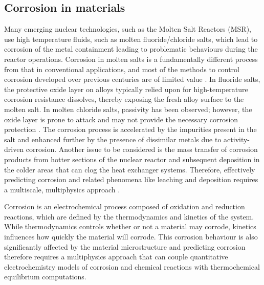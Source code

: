 	\subsection{Corrosion in materials}
	Many emerging nuclear technologies, such as the Molten Salt Reactors (MSR), use high temperature fluids, such as molten fluoride/chloride salts, which lead to corrosion of the metal containment leading to problematic behaviours during the reactor operations. Corrosion in molten salts is a fundamentally different process from that in conventional applications, and most of the methods to control corrosion developed over previous centuries are of limited value \cite{Yoshioka:2017aa}. In fluoride salts, the protective oxide layer on alloys typically relied upon for high-temperature corrosion resistance dissolves, thereby exposing the fresh alloy surface to the molten salt. In molten chloride salts, passivity has been observed; however, the oxide layer is prone to attack and may not provide the necessary corrosion protection \cite{Sridharan:2013aa}. The corrosion process is accelerated by the impurities present in the salt and enhanced further by the presence of dissimilar metals due to activity-driven corrosion. Another issue to be considered is the mass transfer of corrosion products from hotter sections of the nuclear reactor and subsequent deposition in the colder areas that can clog the heat exchanger systems. Therefore, effectively predicting corrosion and related phenomena like leaching and deposition requires a multiscale, multiphysics approach \cite{Mcmurray:2018aa}.

	Corrosion is an electrochemical process composed of oxidation and reduction reactions, which are defined by the thermodynamics and kinetics of the system. While thermodynamics controls whether or not a material may corrode, kinetics influences how quickly the material will corrode. This corrosion behaviour is also significantly affected by the material microstructure and predicting corrosion therefore requires a multiphysics approach that can couple quantitative electrochemistry models of corrosion and chemical reactions with thermochemical equilibrium computations.

